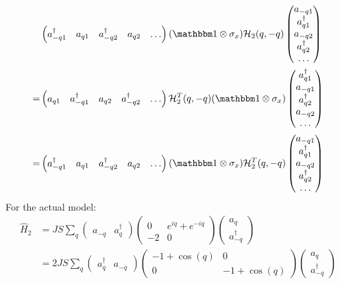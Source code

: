\documentclass{article}
\begin{document}
\begin{align}
	&\begin{pmatrix} 
		a_{-q1}^\dagger & a_{q1} & a_{-q2}^\dagger & a_{q2} & \dots 
	\end{pmatrix} (\mathbbm 1 \otimes \sigma_x) \mathcal H_2(q, -q) \begin{pmatrix}
		a_{-q1} \\ a_{q1}^\dagger \\ a_{-q2} \\ a_{q2}^\dagger \\ \dots
	\end{pmatrix} \\
%
	=& \begin{pmatrix}
		a_{q1} & a_{-q1}^\dagger & a_{q2} & a_{-q2}^\dagger & \dots
	\end{pmatrix} \mathcal H_2^T(q, -q) (\mathbbm 1 \otimes \sigma_x) \begin{pmatrix} 
		a_{q1}^\dagger \\ a_{-q1} \\ a_{q2}^\dagger \\ a_{-q2} \\ \dots 
	\end{pmatrix} \nonumber \\
%
	=& \begin{pmatrix}
		a_{-q1}^\dagger & a_{q1} & a_{-q2}^\dagger & a_{q2} & \dots
	\end{pmatrix} (\mathbbm 1 \otimes \sigma_x) \mathcal H_2^T(q, -q) \begin{pmatrix} 
		a_{-q1} \\ a_{q1}^\dagger \\ a_{-q2} \\ a_{q2}^\dagger \\ \dots 
	\end{pmatrix} \nonumber 
\end{align}
For the actual model:
\begin{align}
	\hat H_2 &= JS \sum_q \begin{pmatrix}
		a_{-q} & a_{q}^\dagger
	\end{pmatrix} \begin{pmatrix}
		0 & e^{iq} + e^{-iq} \\
		-2 & 0
	\end{pmatrix} \begin{pmatrix}
		a_q \\ a_{-q}^\dagger
	\end{pmatrix} \\
%
	&= 2JS \sum_q \begin{pmatrix}
		a_{q}^\dagger & a_{-q}
	\end{pmatrix} \begin{pmatrix}
		-1 + \cos(q) & 0 \\
		0 & -1 + \cos(q)
	\end{pmatrix} \begin{pmatrix}
		a_q \\ a_{-q}^\dagger
	\end{pmatrix}
\end{align}
\end{document}

